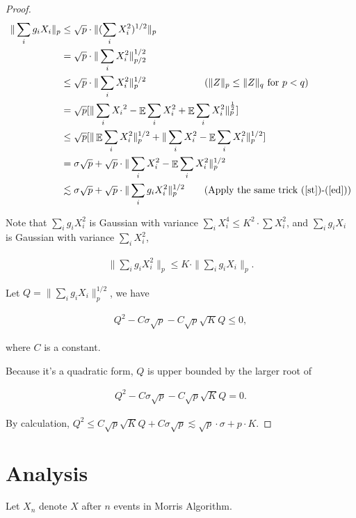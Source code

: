\documentclass[11pt]{article}
\DeclareMathOperator*{\E}{\mathbb{E}}
\begin{document}
\begin{proof}
\begin{align}
\|\sum_{i} {g_iX_i} \|_p &\le \sqrt{p}\cdot \| (\sum_i{X_i^2})^{1/2}\|_p \\
&= \sqrt{p}\cdot \|\sum_i{X_i^2}\|_{p/2}^{1/2} \\
&\le \sqrt{p} \cdot \|\sum_i{X_i^2}\|_p^{1/2} \text{~~~~~~~~~~~~~~~~~~($\|Z\|_p\le \|Z\|_q$ for $p<q$)} \\
&=\sqrt{p} [\| \sum_i{X_i}^2  - \E \sum_i X_i^2 + \E \sum_i X_i^2\|_p^{\frac{1}{2}}] \\
&\le \sqrt{p} [\| \E \sum_i{X_i^2}\|_p^{1/2} + \| \sum_iX_i^2 - \E \sum_i X_i^2 \|_p^{1/2} ] \\
&= \sigma \sqrt{p} + \sqrt{p} \cdot \| \sum_i X_i^2-\E \sum_i X_i^2 \|_p^{1/2} \\
&\lesssim \sigma \sqrt{p} + \sqrt{p} \cdot \|\sum_i g_iX_i^2\|_p^{1/2} \text{ ~~~~~(Apply the same trick (\ref{st})-(\ref{ed}))} 
\end{align}

Note that $\sum_i g_iX_i^2$ is Gaussian with variance $\sum_iX_i^4\le K^2\cdot \sum X_i^2$, and $\sum_i{g_iX_i}$ is Gaussian with variance $\sum_i{X_i^2}$,  

\begin{align}
\|\sum_i{g_iX_i^2}\|_p \le K\cdot  \|\sum_i g_iX_i\|_p.
\end{align}

Let $Q=\| \sum_ig_iX_i\|_p^{1/2} $, we have 

\begin{align}
Q^2-C\sigma\sqrt{p}-C\sqrt{p}\sqrt{K}Q\le 0,
\end{align}

where $C$ is a constant.

Because it's a quadratic form, $Q$ is upper bounded by the larger root of 

\begin{align}
Q^2-C\sigma\sqrt{p}-C\sqrt{p}\sqrt{K}Q=0.
\end{align}

By calculation, $Q^2 \le C\sqrt{p}\sqrt{K}Q+C\sigma\sqrt{p} \lesssim  \sqrt{p}\cdot \sigma+p\cdot K$.

\end{proof}

\section{Analysis}\label{analysis}

Let $X_n$ denote $X$ after $n$ events in Morris Algorithm. 
\end{document}
